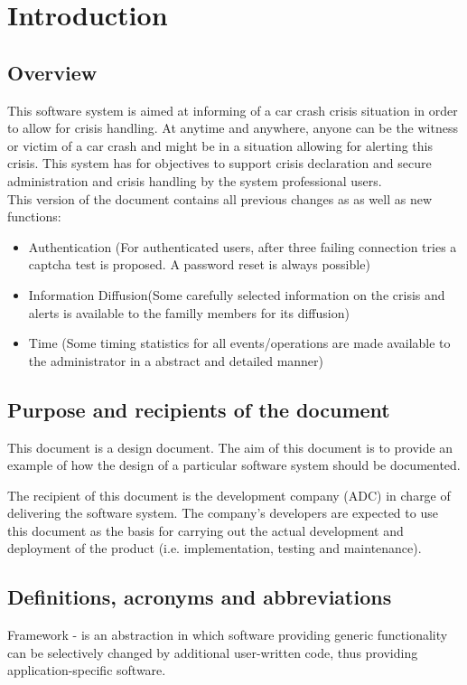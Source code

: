 \chapter{Introduction}
\label{chap:introduction}


\section{Overview}
This software system is aimed at informing of a car crash crisis situation in
order to allow for crisis handling. At anytime and anywhere, anyone can be the
witness or victim of a car crash and might be in a situation allowing for
alerting this crisis. This system has for objectives to support crisis
declaration and secure administration and crisis handling by the system
professional users.\\
This version of the document contains all previous changes as as well as new
functions:
\begin{itemize}
  \item Authentication (For authenticated users, after three failing
  connection tries a captcha test is proposed. A password reset is always
  possible)
  \item Information Diffusion(Some carefully selected information on
the crisis and alerts is available to the familly members for its diffusion)
  \item Time (Some timing statistics for all events/operations
are made available to the administrator in a abstract and detailed manner)
\end{itemize}
  




\section{Purpose and recipients of the document}
This document is a design document. The aim of this document is to provide an
example of how the design of a particular software system should be documented. 

The recipient of this document is the development company (ADC) in charge
of delivering the software system. The company's developers are
expected to use this document as the basis for carrying out the actual
development and deployment of the product (i.e. implementation, testing
and maintenance).





\section{Definitions, acronyms and abbreviations}
Framework - is an abstraction in which software providing generic functionality
can be selectively changed by additional user-written code, thus providing application-specific software.


